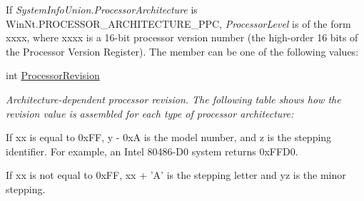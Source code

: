 \begin{DoxyCompactItemize}
\begin{DoxyCompactList}
\begin{TabularC}{2}
\hline
Value} &Description  \\\cline{1-2}
21064} &Alpha 21064  \\\cline{1-2}
21066} &Alpha 21066  \\\cline{1-2}
21164} &Alpha 21164  \\\cline{1-2}
\end{TabularC}


If {\itshape SystemInfoUnion.ProcessorArchitecture\/} is WinNt.PROCESSOR\_\-ARCHITECTURE\_\-PPC, {\itshape ProcessorLevel\/} is of the form xxxx, where xxxx is a 16-\/bit processor version number (the high-\/order 16 bits of the Processor Version Register). The member can be one of the following values: 

\begin{TabularC}{2}
\hline
Value} &Description  \\\cline{1-2}
1} &PPC 601  \\\cline{1-2}
3} &PPC 603  \\\cline{1-2}
4} &PPC 604  \\\cline{1-2}
6} &PPC 603+  \\\cline{1-2}
9} &PPC 604+  \\\cline{1-2}
20} &PPC 620  \\\cline{1-2}
\end{TabularC}
\item\end{DoxyCompactList}\item 
int \hyperlink{struct_tao_1_1_platform_1_1_windows_1_1_kernel_1_1_s_y_s_t_e_m___i_n_f_o_a3390dea5c0bcfaeae36cd427d01c51a2}{ProcessorRevision}
\begin{DoxyCompactList}\small\item\em Architecture-\/dependent processor revision. The following table shows how the revision value is assembled for each type of processor architecture: 

\begin{TabularC}{2}
\hline
Processor} &Description  \\\cline{1-2}
Intel 80386 or 80486} &A value of the form xxyz. \\\cline{1-2}
\end{TabularC}


If xx is equal to 0xFF, y -\/ 0xA is the model number, and z is the stepping identifier. For example, an Intel 80486-\/D0 system returns 0xFFD0. 

If xx is not equal to 0xFF, xx + 'A' is the stepping letter and yz is the minor stepping. 


\end{DoxyCompactList}
\end{DoxyCompactItemize}
